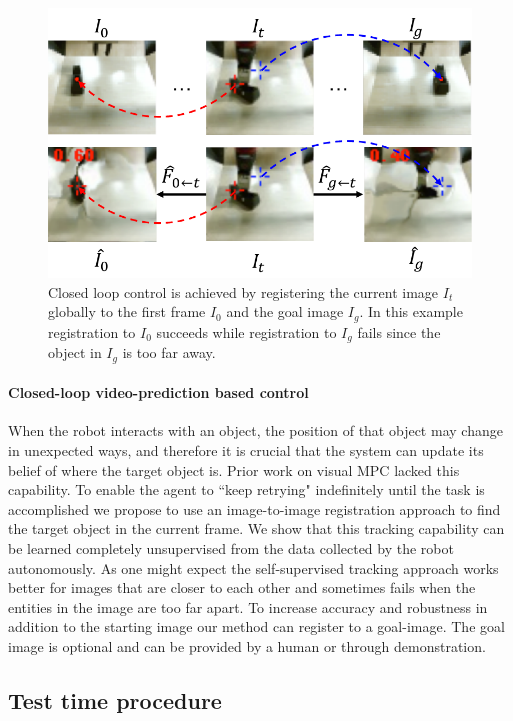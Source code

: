 \begin{figure}
\vspace{-0.25in}
\centering
\includegraphics[width=0.5\columnwidth]{images/registration_singletime.pdf}
\caption{\small{Closed loop control is achieved by registering the current image $I_t$ globally to the first frame $I_0$ and the goal image $I_g$. In this example registration to $I_0$ succeeds while registration to $I_g$ fails since the object in $I_g$ is too far away. }
\label{fig:reg_single}
\vspace{-0.2in}
}
\end{figure}


\paragraph{Closed-loop video-prediction based control}

When the robot interacts with an object, the position of that object may change in unexpected ways, and therefore it is crucial that the system can update its belief of where the target object is. Prior work on visual MPC lacked this capability. To enable the agent to ``keep retrying" indefinitely until the task is accomplished we propose to use an image-to-image registration approach to find the target object in the current frame. 
We show that this tracking capability can be learned completely unsupervised from the data collected by the robot autonomously. As one might expect the self-supervised tracking approach works better for images that are closer to each other and sometimes fails when the entities in the image are too far apart. To increase accuracy and robustness in addition to the starting image our method can register to a goal-image. The goal image is optional and can be provided by a human or through demonstration.

\subsection{Test time procedure}

